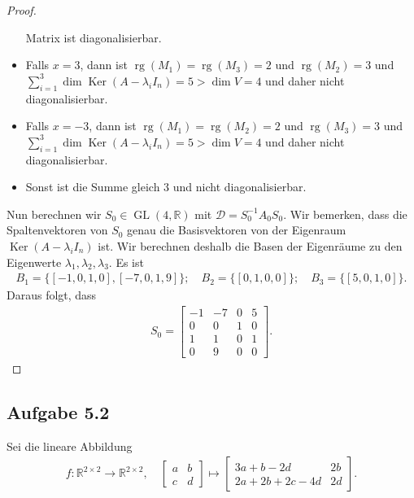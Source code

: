 \documentclass[draft,a5paper]{article}
\theoremstyle{remark}
\DeclareMathOperator{\Ker}{Ker}
\DeclareMathOperator{\GL}{GL}
\DeclareMathOperator{\rg}{rg}
\begin{document}
\begin{proof}
\begin{itemize}
    Matrix ist diagonalisierbar.
  \item Falls \(x = 3\), dann ist
    \(\rg(M_{1}) = \rg(M_{3}) = 2\) und \(\rg(M_{2}) = 3\) und
    \( \sum_{i = 1}^{3}{\dim \Ker(A - \lambda_{i} I_{n})} = 5 > \dim V = 4\)
    und daher nicht diagonalisierbar.
  \item Falls \(x = -3\), dann ist
    \(\rg(M_{1}) = \rg(M_{2}) = 2\) und \(\rg(M_{3}) = 3\) und
    \( \sum_{i = 1}^{3}{\dim \Ker(A - \lambda_{i} I_{n})} = 5 > \dim V = 4\)
    und daher nicht diagonalisierbar.
  \item Sonst ist die Summe gleich \(3\) und nicht diagonalisierbar.
  \end{itemize}
  Nun berechnen wir \(S_{0} \in \GL(4, \mathbb{R})\) mit
  \(\mathcal{D} = S_{0}^{-1} A_{0} S_{0}\).  Wir bemerken, dass die
  Spaltenvektoren von \(S_{0}\) genau die Basisvektoren von der Eigenraum
  \(\Ker(A - \lambda_{i}I_{n})\) ist.  Wir berechnen deshalb die Basen der
  Eigenräume zu den Eigenwerte \(\lambda_{1}, \lambda_{2}, \lambda_{3}\).
  Es ist
  \begin{align*}
    B_{1} = \{[-1, 0, 1, 0], [-7, 0, 1, 9]\}; \quad B_{2} = \{[0, 1,
    0, 0]\}; \quad B_{3} = \{[5, 0, 1, 0]\}.
  \end{align*}
  Daraus folgt, dass
  \begin{align*}
    S_{0} =
    \begin{bmatrix}
      -1 & -7 & 0 & 5 \\
      0 & 0 & 1 & 0 \\
      1 & 1 & 0 & 1 \\
      0 & 9 & 0 & 0
    \end{bmatrix}.
  \end{align*}
\end{proof}

\subsection*{Aufgabe 5.2}

Sei die lineare Abbildung
\begin{align*}
  f\colon \mathbb{R}^{2 \times 2} \to \mathbb{R}^{2 \times 2}, \quad
  \begin{bmatrix}
    a & b \\
    c & d
  \end{bmatrix}
  \mapsto
  \begin{bmatrix}
    3a + b - 2d & 2b \\
    2a+ 2b + 2c - 4d & 2d
  \end{bmatrix}.
\end{align*}
\end{document}
